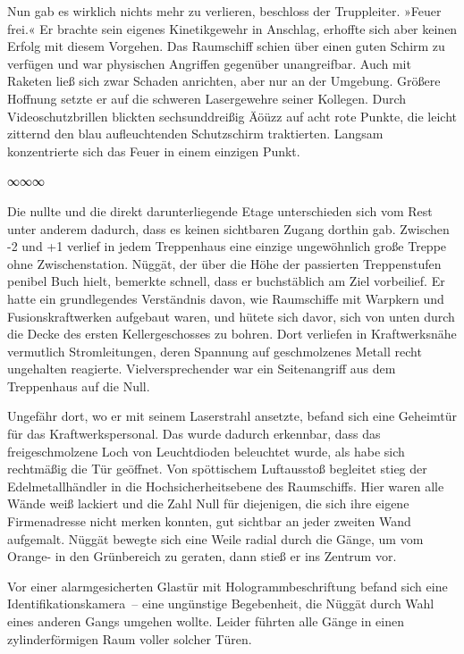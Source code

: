 Nun gab es wirklich nichts mehr zu verlieren, beschloss der Truppleiter. »Feuer frei.« Er brachte sein eigenes Kinetikgewehr in Anschlag, erhoffte sich aber keinen Erfolg mit diesem Vorgehen. Das Raumschiff schien über einen guten Schirm zu verfügen und war physischen Angriffen gegenüber unangreifbar. Auch mit Raketen ließ sich zwar Schaden anrichten, aber nur an der Umgebung. Größere Hoffnung setzte er auf die schweren Lasergewehre seiner Kollegen. Durch Videoschutzbrillen blickten sechsunddreißig Äöüzz auf acht rote Punkte, die leicht zitternd den blau aufleuchtenden Schutzschirm traktierten. Langsam konzentrierte sich das Feuer in einem einzigen Punkt.

\begin{center}
∞∞∞
\end{center}

Die nullte und die direkt darunterliegende Etage unterschieden sich vom Rest unter anderem dadurch, dass es keinen sichtbaren Zugang dorthin gab. Zwischen -2 und +1 verlief in jedem Treppenhaus eine einzige ungewöhnlich große Treppe ohne Zwischenstation. Nüggät, der über die Höhe der passierten Treppenstufen penibel Buch hielt, bemerkte schnell, dass er buchstäblich am Ziel vorbeilief. Er hatte ein grundlegendes Verständnis davon, wie Raumschiffe mit Warpkern und Fusionskraftwerken aufgebaut waren, und hütete sich davor, sich von unten durch die Decke des ersten Kellergeschosses zu bohren. Dort verliefen in Kraftwerksnähe vermutlich Stromleitungen, deren Spannung auf geschmolzenes Metall recht ungehalten reagierte. Vielversprechender war ein Seitenangriff aus dem Treppenhaus auf die Null.

Ungefähr dort, wo er mit seinem Laserstrahl ansetzte, befand sich eine Geheimtür für das Kraftwerkspersonal. Das wurde dadurch erkennbar, dass das freigeschmolzene Loch von Leuchtdioden beleuchtet wurde, als habe sich rechtmäßig die Tür geöffnet. Von spöttischem Luftausstoß begleitet stieg der Edelmetallhändler in die Hochsicherheitsebene des Raumschiffs. Hier waren alle Wände weiß lackiert und die Zahl Null für diejenigen, die sich ihre eigene Firmenadresse nicht merken konnten, gut sichtbar an jeder zweiten Wand aufgemalt. Nüggät bewegte sich eine Weile radial durch die Gänge, um vom Orange- in den Grünbereich zu geraten, dann stieß er ins Zentrum vor.

Vor einer alarmgesicherten Glastür mit Hologrammbeschriftung befand sich eine Identifikationskamera~– eine ungünstige Begebenheit, die Nüggät durch Wahl eines anderen Gangs umgehen wollte. Leider führten alle Gänge in einen zylinderförmigen Raum voller solcher Türen.

